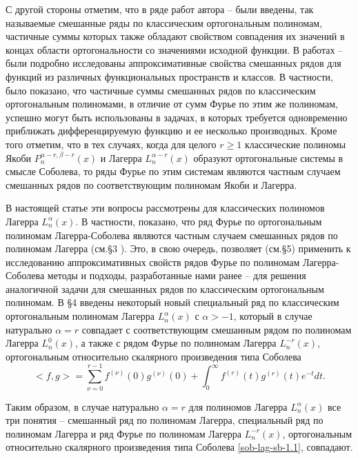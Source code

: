 С другой стороны отметим, что в ряде работ автора \cite{Haar-Tcheb-Shar11} -- \cite{Haar-Tcheb-Shar16}  были введены, так называемые смешанные ряды по классическим ортогональным полиномам, частичные суммы которых также обладают свойством совпадения их значений в концах области ортогональности  со  значениями исходной функции.  В работах \cite{Haar-Tcheb-Shar11} -- \cite{Haar-Tcheb-Shar16} были подробно исследованы аппроксимативные свойства смешанных рядов для функций из различных функциональных пространств и классов. В частности, было показано, что частичные суммы смешанных рядов по классическим ортогональным полиномами, в отличие от сумм Фурье по этим же полиномам, успешно могут быть использованы в задачах, в которых требуется одновременно приближать дифференцируемую функцию и ее несколько производных. Кроме того отметим, что в тех случаях, когда для целого $r\ge1$ классические полиномы Якоби $P_n^{\alpha-r,\beta-r}(x)$  и Лагерра $L_n^{\alpha-r}(x)$ образуют ортогональные системы в смысле Соболева, то ряды Фурье по этим системам являются частным случаем смешанных рядов по соответствующим полиномам Якоби и Лагерра.

В настоящей статье эти вопросы рассмотрены для классических полиномов Лагерра $L_n^\alpha(x)$. В частности, показано, что     ряд Фурье по ортогональным полиномам Лагерра-Соболева   являются частным случаем смешанных рядов по полиномам Лагерра  (см.\S3 ). Это, в свою очередь,  позволяет (см.\S5) применить к исследованию аппроксимативных свойств рядов Фурье по полиномам Лагерра-Соболева методы и подходы, разработанные нами ранее \cite{Haar-Tcheb-Shar11} -- \cite{Haar-Tcheb-Shar16} для решения аналогичной задачи для смешанных рядов по классическим ортогональным полиномам. В \S4 введены некоторый новый специальный ряд по классическим ортогональным полиномам Лагерра $L_n^\alpha(x)$ с $\alpha>-1$, который в случае  натурально $\alpha=r$ совпадает с соответствующим смешанным рядом по полиномам Лагерра $L_n^0(x)$, а также с рядом Фурье по полиномам Лагерра $L_n^{-r}(x)$, ортогональным относительно скалярного произведения типа Соболева
\begin{equation}\label{sob-lag-sb-1.1}
<f,g>=\sum_{\nu=0}^{r-1}f^{(\nu)}(0)g^{(\nu)}(0)+\int_0^\infty f^{(r)}(t)g^{(r)}(t)e^{-t}dt.
\end{equation}


Таким образом, в случае натурально $\alpha=r$ для полиномов Лагерра $L_n^\alpha(x)$ все три понятия -- смешанный ряд по полиномам Лагерра, специальный ряд по полиномам Лагерра и ряд Фурье  по полиномам Лагерра $L_n^{-r}(x)$, ортогональным относительно скалярного произведения типа Соболева \eqref{sob-lag-sb-1.1}, совпадают.

